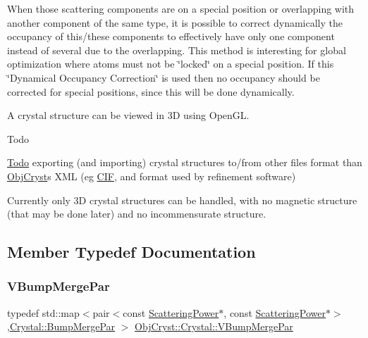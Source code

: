 When those scattering components are on a special position or overlapping with another component of the same type, it is possible to correct dynamically the occupancy of this/these components to effectively have only one component instead of several due to the overlapping. This method is interesting for global optimization where atoms must not be \char`\"{}locked\char`\"{} on a special position. If this \char`\"{}\+Dynamical Occupancy Correction\char`\"{} is used then no occupancy should be corrected for special positions, since this will be done dynamically.

A crystal structure can be viewed in 3D using Open\+GL.

\begin{DoxyRefDesc}{Todo}
\item[\mbox{\hyperlink{todo__todo000001}{Todo}}]exporting (and importing) crystal structures to/from other files format than \mbox{\hyperlink{namespace_obj_cryst}{Obj\+Cryst}}\textquotesingle{}s X\+ML (eg \mbox{\hyperlink{class_obj_cryst_1_1_c_i_f}{C\+IF}}, and format used by refinement software)\end{DoxyRefDesc}


Currently only 3D crystal structures can be handled, with no magnetic structure (that may be done later) and no incommensurate structure. 

\subsection{Member Typedef Documentation}
\mbox{\label{class_obj_cryst_1_1_crystal_af57b44b799f164dbc86227f555a5eee5}} 
\subsubsection{\texorpdfstring{VBumpMergePar}{VBumpMergePar}}
{\footnotesize\ttfamily typedef std\+::map$<$pair$<$const \mbox{\hyperlink{class_obj_cryst_1_1_scattering_power}{Scattering\+Power}}$\ast$, const \mbox{\hyperlink{class_obj_cryst_1_1_scattering_power}{Scattering\+Power}}$\ast$$>$,\mbox{\hyperlink{struct_obj_cryst_1_1_crystal_1_1_bump_merge_par}{Crystal\+::\+Bump\+Merge\+Par}} $>$ \mbox{\hyperlink{class_obj_cryst_1_1_crystal_af57b44b799f164dbc86227f555a5eee5}{Obj\+Cryst\+::\+Crystal\+::\+V\+Bump\+Merge\+Par}}}

